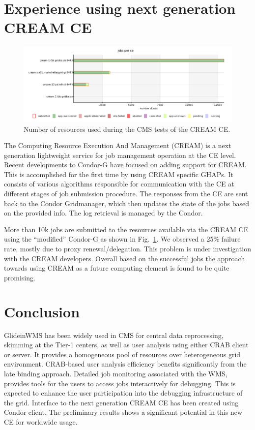 \documentclass[a4paper]{jpconf}
\begin{document}
\section{Experience using next generation CREAM CE}
\begin{figure}
\begin{center}
\includegraphics[scale=0.45]{cms_cream}
\end{center}
\caption{Number of resources used during the CMS tests of the CREAM CE.}
\label{fig:cms_cream}
\end{figure}
The Computing Resource Execution And Management (CREAM) is a next generation lightweight service 
for job management operation at the CE level. Recent developments to Condor-G have focused on adding 
support for CREAM. This is accomplished for the first time by using CREAM specific GHAPs. It consists 
of various algorithms responsible for communication with the CE at different stages of job submission
procedure. The responses from the CE are sent back to the Condor Gridmanager, which then updates 
the state of the jobs based on the provided info. The log retrieval is managed by the Condor.

More than 10k jobs are submitted to the resources available via the CREAM CE using the ``modified'' Condor-G as 
shown in Fig.~\ref{fig:cms_cream}. We observed a 25\% failure rate, mostly due to proxy renewal/delegation. 
This problem is under investigation with the CREAM developers. Overall based on the successful jobs
the approach towards using CREAM as a future computing element is found to be quite promising.
\section{Conclusion}
GlideinWMS has been widely used in CMS for central data reprocessing, skimming at the Tier-1 centers, as well
as user analysis using either CRAB client or server. It provides a homogeneous pool of resources over
heterogeneous grid environment. CRAB-based user analysis efficiency benefits significantly from the late
binding approach. Detailed job monitoring associated with the WMS, provides tools for the users to access 
jobs interactively for debugging. This is expected to enhance the user participation into the debugging 
infrastructure of the grid. Interface to the next generation CREAM CE has been created using Condor client. 
The preliminary results shows a significant potential in this new CE for worldwide usage. 
\end{document}

